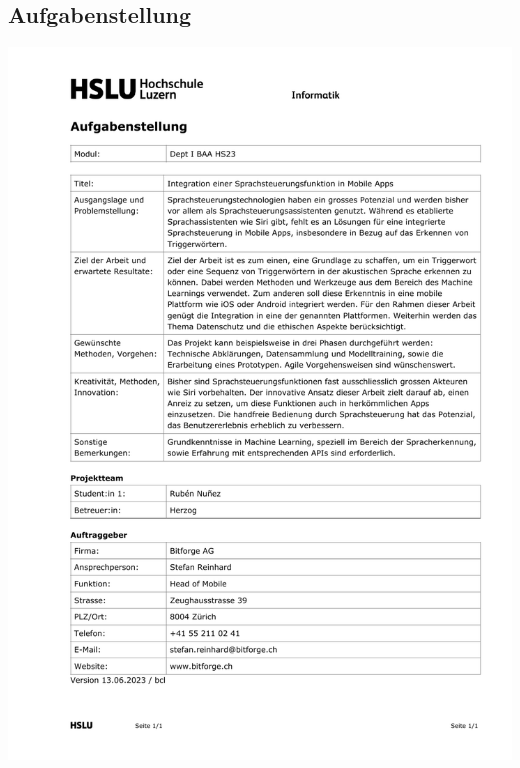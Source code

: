 \documentclass[11pt,a4paper]{article}
\begin{document}
\subsection{Aufgabenstellung}
\includegraphics[width=1\linewidth]{Aufgabenstellung_BAA.pdf}
\end{document}
